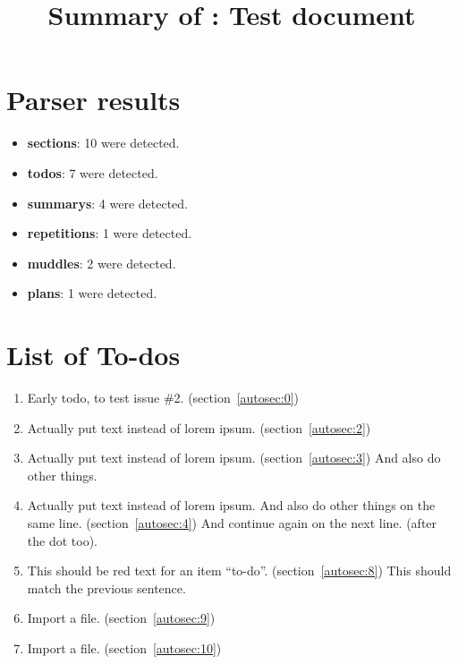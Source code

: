 \title{Summary of : Test document}
\maketitle

\section{Parser results}
    \begin{itemize}[noitemsep]
\item \textbf{sections}: 10 were detected.
\item \textbf{todos}: 7 were detected.
\item \textbf{summarys}: 4 were detected.
\item \textbf{repetitions}: 1 were detected.
\item \textbf{muddles}: 2 were detected.
\item \textbf{plans}: 1 were detected.
    \end{itemize}

\section{List of To-dos}
    \begin{enumerate}[noitemsep]
        \item {\color{red}Early todo, to test issue \#2.} (section~\ref{autosec:0})
        \item {\color{red}Actually put text instead of lorem ipsum.} (section~\ref{autosec:2})
        \item {\color{red}Actually put text instead of lorem ipsum.} (section~\ref{autosec:3})
{\color{red}And also do other things.}
        \item {\color{red}Actually put text instead of lorem ipsum. And also do other things on the same line.} (section~\ref{autosec:4})
{\color{red}And continue again on the next line. (after the dot too).}
        \item {\color{red}This should be red text for an item ``to-do''.} (section~\ref{autosec:8})
{\color{red}This should match the previous sentence.}
        \item {\color{red}Import a file.} (section~\ref{autosec:9})
        \item {\color{red}Import a file.} (section~\ref{autosec:10})
    \end{enumerate}

